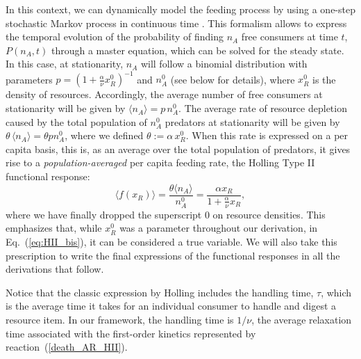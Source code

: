 In this context, we can dynamically model the feeding process by using a one-step stochastic Markov process in continuous time \citep{Black2012}.  This formalism allows to express the temporal evolution of the probability of finding $n_A$ free consumers at time $t$, $P(n_A,t)$ through a master equation, which can be solved for the steady state. In this case, at stationarity, $n_A$ will follow a binomial distribution with parameters $p = \left(1 + \frac{\alpha}{\nu} x_R^0\right)^{-1}$ and $n_A^0$ (see below for details), where $x_R^0$ is the density of resources. Accordingly, the average number of free consumers at stationarity will be given by $\langle n_A \rangle= p\,n_A^0$. The average rate of resource depletion caused by the total population of $n_A^0$ predators at stationarity will be given by $\theta\,\langle n_A \rangle = \theta p n_A^0$, where we defined $\theta:=\alpha\,x_R^0$. When this rate is expressed on a per capita basis, this is, as an average over the total population of predators, it gives rise to a {\em population-averaged} per capita feeding rate, the Holling Type II functional response: 
\begin{equation}
\langle f(x_R) \rangle = 
\frac{\theta \langle n_A\rangle}{n_A^0} =
\frac{\alpha x_R}{1 + \frac{\alpha}{\nu} x_R},
\label{eq:HII_bis}
\end{equation}
where we have finally dropped the superscript 0 on resource densities. This emphasizes that, while $x^0_R$ was a parameter throughout our derivation, in Eq.~(\ref{eq:HII_bis}), it can be considered a true variable. We will also take this prescription to write the final expressions of the functional responses in all the derivations that follow. 
\smallskip

Notice that the classic expression by Holling includes the handling time, $\tau$, which is the average time it takes for an individual consumer to handle and digest a resource item. In our framework, the handling time is $1/\nu$, the average relaxation time associated with the first-order kinetics represented by reaction~(\ref{death_AR_HII}).   
\smallskip

